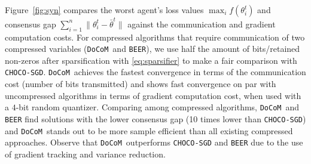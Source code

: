 \documentclass[10pt]{article} %
\theoremstyle{plain}
\theoremstyle{definition}
\theoremstyle{remark}
\newcommand{\aname}{{\tt DoCoM}}
\newcommand{\prm}{\theta}
\newcommand{\avgtheta}{\bar{\prm}}
\begin{document}
Figure~\ref{fig:syn} compares the worst agent's loss values $\max_i f( \theta_i^t)$ and consensus gap $\sum_{i=1}^n \| \theta_i^t - \avgtheta^t \|$ against the communication and gradient computation costs. For compressed algorithms that require communication of two compressed variables (\aname~and {\tt BEER}), we use half the amount of bits/retained non-zeros after sparsification with \eqref{eq:sparsifier} to make a fair comparison with {\tt CHOCO-SGD}.
\aname~achieves the fastest convergence in terms of the communication cost (number of bits transmitted) and shows fast convergence on par with uncompressed algorithms in terms of gradient computation cost, when used with a $4$-bit random quantizer. Comparing among compressed algorithms, \aname~and {\tt BEER} find solutions with the lower consensus gap (10 times lower than {\tt CHOCO-SGD}) and \aname~stands out to be more sample efficient than all existing compressed approaches. Observe that \aname~outperforms {\tt CHOCO-SGD} and {\tt BEER} due to the use of gradient tracking and variance reduction.

\end{document}
